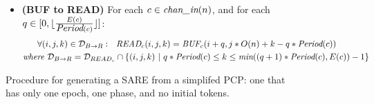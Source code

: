 \begin{figure}[ht]
{\begin{minipage}{6.3in}
\begin{itemize}
\begin{align}
  \mt{WRITE}_{c}(i, q, j - q * U(c)) \\ \nonumber
&\mt{where } {\cal D}_{W \rightarrow B}(c,q) = 
  {\cal D}_{{BUF}_{c}} \cap 
  \{ (i,j)~|~q*U(c) \le j \le (q+1)*U(c) - 1 \}
\end{align}
\item {\bf(BUF to READ)} For each $c \in \mbox{\it chan\_in}(n)$, 
       and for each $q \in [0, \lfloor \frac{E(c)}{\mbox{\it Period}(c)} \rfloor ]$:
\begin{align}
\label{eq:b2r}
&~~~~~\forall (i,j,k) \in {\cal D}_{B \rightarrow R}:~~
\mbox{\it READ}_{c}(i,j,k) = \mbox{\it BUF}_{c}(i+q,j*O(n) + k - q * \mbox{\it Period}(c)) \\ \nonumber
&\mbox{\it where }{\cal D}_{B \rightarrow R} = 
  {\cal D}_{READ_{c}} \cap \{ (i,j,k)~|~q * \mbox{\it Period}(c) \le k \le \mbox{\it min}((q+1)*\mbox{\it Period}(c), E(c)) - 1 \} 
\end{align}
\vspace{-12pt}
\end{itemize}
\end{minipage}}
\caption{Procedure for generating a SARE from a simplifed PCP:  one that has only one epoch, one phase, and no initial tokens.
\protect\label{fig:sdftosare}}
\end{figure}





